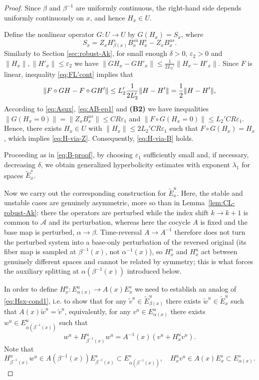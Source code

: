\documentclass[12pt]{article}
\theoremstyle{definition}
\begin{document}
\begin{proof}
Since $\beta$ and $\beta^{-1}$ are uniformly continuous, the right-hand side depends uniformly continuously on $x$, and hence $H_x \in U$.

Define the nonlinear operator $G:U \to U$ by $G(H_x) = S_x$, where
$$
S_x = Z_x H^s_{\beta(x)}B^{su}_xH^s_x  - Z_x  B^{us}_x.
$$
Similarly to Section \ref{sec:robust-Ak}, for small enough $\delta > 0$, $\varepsilon_2 > 0$ and $\|H_x\|, \|H'_x\| \leq \varepsilon_2$ we have
$
\|GH_x-GH'_x\| \leq \frac{1}{2L_2'}\|H_x-H'_x\|.
$
Since $F$ is linear, inequality \eqref{eq:FL'cont} implies that
\begin{equation}\notag%
\|F \circ GH - F \circ GH'\| \leq L_2'\frac{1}{2L_2'}\|H-H'\| = \frac{1}{2}\|H-H'\|,    
\end{equation}
According to \eqref{eq:Asux}, \eqref{eq:AB-ep1} and \textbf{(B2)} we have inequalities $\|G(H_x = 0)\| = \|Z_xB^{us}_x\| \leq CR\varepsilon_1$ and 
$
\|F \circ G (H_x = 0)\|\leq L_2'CR\varepsilon_1
$.
Hence, there exists $H_x \in U$ with $\|H_x\| \leq 2L_2'CR\varepsilon_1$ such that 
$F\circ G (H_x) = H_x$, which implies \eqref{eq:H-via-Z}. Consequently, \eqref{eq:H-via-B} holds.

Proceeding as in \eqref{eq:B-proof}, by choosing $\varepsilon_1$ sufficiently small and, if necessary, decreasing $\delta$, we obtain generalized hyperbolicity estimates with exponent $\lambda_1$ for spaces $\tilde{E}_x^s$. 

\medskip

Now we carry out the corresponding construction for $\tilde{E}^u_x$. Here, the stable and unstable cases are genuinely asymmetric, more so than in Lemma~\ref{lem:CL-robust-Ak}: there the operators are perturbed while the index shift $k \to k+1$ is common to $\mathcal{A}$ and its perturbation, whereas here the cocycle $A$ is fixed and the base map is perturbed, $\alpha \to \beta$. Time-reversal $A \to A^{-1}$ therefore does not turn the perturbed system into a base-only perturbation of the reversed original (its fiber map is sampled at $\beta^{-1}(x)$, not $\alpha^{-1}(x)$), so $H^s_x$ and $H^u_x$ act between genuinely different spaces and cannot be related by symmetry; this is what forces the auxiliary splitting at $\alpha(\beta^{-1}(x))$ introduced below.

In order to define $H^u_{x}: E_{\alpha(x)}^u \to A(x)E_x^s$ we need to establish an analog of \eqref{eq:Hsx-cond1}, i.e. to show that for any $\tilde{v}^u \in \tilde{E}^u_{\beta(x)}$ there exists $\tilde{w}^u \in \tilde{E}^u_{x}$ such that
$
A(x)\tilde{w}^u = \tilde{v}^u
$,
equivalently, for any $v^u \in E^u_{\alpha(x)}$ there exists $w^u \in E^u_{\alpha(\beta^{-1}(x))}$ such that
\begin{equation}\label{eq:cond-Eu}
w^u + H_{\beta^{-1}(x)}^uw^u =  A^{-1}(x)(v^u + H_x^uv^u).
\end{equation}
Note that 
$$
H_{\beta^{-1}(x)}^uw^u \in A(\beta^{-1}(x))E^s_{\beta^{-1}(x)} \subset E^s_{\alpha(\beta^{-1}(x))},
\quad
H_{x}^uv^u \in A(x)E^s_{x} \subset E^s_{\alpha(x)}.
$$


\end{proof}
\end{document}
